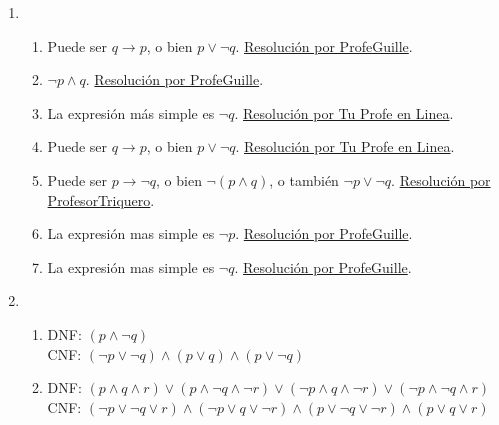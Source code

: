 \documentclass[a4paper]{article}
\newcommand{\exercise}{\item}
\newcommand{\then}{\to}
\begin{document}
\begin{enumerate}
\begin{enumerate} [label=(\alph*)]
		\item La \href{https://www.wolframalpha.com/input?i=%28p+%3D%3E+%28q+or+r%29%29+%3C%3D%3E+%28%28p+and+r%29+%3D%3E+%5Cneg+q%29}{tabla de verdad} revela que es una contingencia. Por lo tanto, las proposiciones no son equivalentes. Para más detalles ver la \href{https://www.youtube.com/live/-yHPDgU-lfE?feature=share&t=578}{resolución por Julio Profe}.
		\item La \href{https://www.wolframalpha.com/input?i=not+%28%28p+and+q%29+%3D%3E+not+r%29+%3C%3D%3E++%28%28p+and+q%29+or+r%29}{tabla de verdad} revela que es una contingencia. Por lo tanto, no son equivalentes. 
		\item La \href{https://www.wolframalpha.com/input?i=truth+table%3A+%28p+%3D%3E+%28q+and+r+and+s%29%29+%3C%3D%3E+%28%28p+%3D%3E+q%29+and+%28p+%3D%3E+r%29+and+%28p+%3D%3E+s%29%29}{tabla de verdad} revela que es una tautología. Por lo tanto, son equivalentes. Esta regla de equivalencia no tiene nombre.
\end{enumerate}\exercise\begin{enumerate} [label=(\alph*)]		\item Puede ser $q \then p$, o bien $p \lor \neg q$. \href{https://youtu.be/5r8S-wMJq7I}{Resolución por ProfeGuille}.
		\item $\neg p \land q$. \href{https://youtu.be/Ayk4qXcoiOM}{Resolución por ProfeGuille}.
		\item La expresión más simple es $\neg q$. \href{https://youtu.be/BOydu7cpv70?t=884}{Resolución por Tu Profe en Linea}.
		\item Puede ser $q \then p$, o bien $p \lor \neg q$. \href{https://youtu.be/BOydu7cpv70?t=334}{Resolución por Tu Profe en Linea}.
		\item Puede ser $p \then \neg q$, o bien $\neg ( p \land q )$, o también $\neg p \lor \neg q$. \href{https://youtu.be/p005yi28rgk?t=392}{Resolución por ProfesorTriquero}.
		\item La expresión mas simple es $\neg p$. \href{https://youtu.be/UZDME4cZxNc}{Resolución por ProfeGuille}.
		\item La expresión mas simple es $\neg q$. \href{https://youtu.be/DbjwP3w5yTE}{Resolución por ProfeGuille}.
\end{enumerate}\exercise\begin{enumerate} [label=(\alph*)]		\item DNF: $(p\land \neg q)$  \\ CNF: $(\neg p\lor \neg q) \land  (p\lor q) \land  (p\lor \neg q)$
		\item DNF: $(p\land q\land r) \lor  (p\land \neg q\land \neg r) \lor  (\neg p\land q\land \neg r) \lor  (\neg p\land \neg q\land r)$  \\ CNF: $(\neg p\lor \neg q\lor r) \land  (\neg p\lor q\lor \neg r) \land  (p\lor \neg q\lor \neg r) \land  (p\lor q\lor r)$

\end{enumerate}
\end{enumerate}
\end{document}
